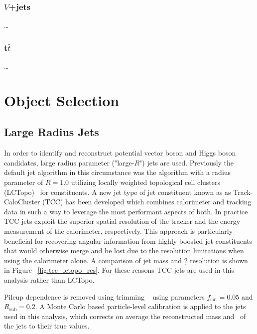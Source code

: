 \subsubsection{$V$+jets}
\dots

\subsubsection{t$\bar{t}$}
\dots

\section{Object Selection}
\label{sec:objects}
\subsection{Large Radius Jets}
\label{sec:tccjets}
In order to identify and reconstruct potential vector boson and Higgs boson candidates, large radius parameter ("large-$R$") jets are used.
Previously the default jet algorithm in this circumstance was the \akt algorithm with a radius parameter of $R=1.0$ utilizing locally weighted topological cell clusters (LCTopo)~\cite{PERF-2014-07} for constituents.
A new jet type of jet constituent known as as Track-CaloCluster (TCC) has been developed \cite{ATL-PHYS-PUB-2017-015} which combines calorimeter and tracking data in such a way to leverage the most performant aspects of both.
In practice TCC jets exploit the superior spatial resolution of the tracker and the energy measurement of the calorimeter, respectively.
This approach is particularly beneficial for recovering angular information from highly boosted jet constituents that would otherwise merge and be lost due to the resolution limitations when using the calorimeter alone.
A comparison of jet mass and \d2 resolution is shown in Figure ~\ref{fig:tcc_lctopo_res}.
For these reasons TCC jets are used in this analysis rather than LCTopo.

Pileup dependence is removed using trimming ~\cite{Krohn:2009th} using parameters $f_{\mathrm{cut}} = 0.05$ and $R_{\mathrm{sub}} = 0.2$.
A Monte Carlo based particle-level calibration is applied to the jets used in this analysis, which corrects on average the reconstructed mass and \pt\ of the jets to their true values.

